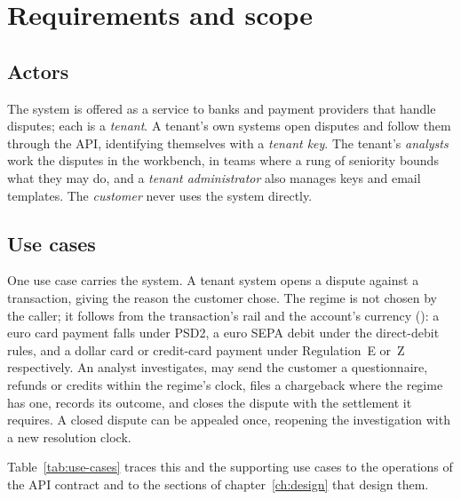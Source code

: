 \chapter{Requirements and scope}
\label{ch:requirements}


\section{Actors}
\label{sec:req-actors}

The system is offered as a service to banks and payment providers that handle disputes; each is a
\emph{tenant}. A tenant's own systems open disputes and follow them through the API, identifying
themselves with a \emph{tenant key}. The tenant's \emph{analysts} work the disputes in the
workbench, in teams where a rung of seniority bounds what they may do, and a \emph{tenant
administrator} also manages keys and email templates. The
\emph{customer} never uses the system directly.

\section{Use cases}
\label{sec:req-use-cases}

One use case carries the system. A tenant system opens a dispute against a transaction, giving the
reason the customer chose. The regime is not chosen by the caller; it follows from the
transaction's rail and the account's currency (): a euro card payment falls
under PSD2, a euro SEPA debit under the direct-debit rules, and a dollar card or credit-card payment
under Regulation~E or~Z respectively. An analyst investigates, may send the customer a
questionnaire, refunds or credits within the regime's clock, files a chargeback where the regime
has one, records its outcome, and closes the dispute with the settlement it requires. A closed
dispute can be appealed once, reopening the investigation with a new resolution clock.

Table~\ref{tab:use-cases} traces this and the supporting use cases to the operations of
the API contract and to the sections of chapter~\ref{ch:design} that design them.

